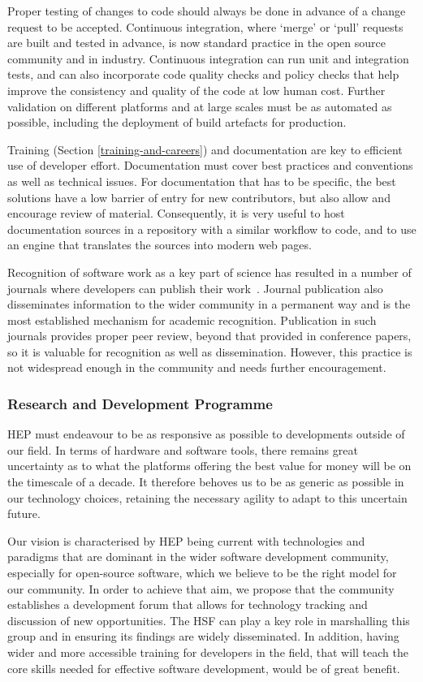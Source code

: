 Proper testing of changes to code should always be done in advance of a
change request to be accepted. Continuous integration, where `merge' or
`pull' requests are built and tested in advance, is now standard practice
in the open source community and in industry. Continuous integration can
run unit and integration tests, and can also incorporate code quality
checks and policy checks that help improve the consistency and quality
of the code at low human cost. Further validation on different platforms
and at large scales must be as automated as possible, including the
deployment of build artefacts for production.

Training (Section \ref{training-and-careers}) and documentation
are key to efficient use
of developer effort. Documentation must cover best practices and
conventions as well as technical issues. For documentation that has to
be specific, the best solutions have a low barrier of entry for new
contributors, but also allow and encourage review of material.
Consequently, it is very useful to host documentation sources in a
repository with a similar workflow to code, and to use an engine that
translates the sources into modern web pages.

Recognition of software work as a key part of science has resulted in a
number of journals where developers can publish their work~\cite{SSI2017}. Journal publication also disseminates information to the
wider community in a permanent way and is the most established mechanism
for academic recognition. Publication in such journals provides proper
peer review, beyond that provided in conference papers, so it is
valuable for recognition as well as dissemination. However, this
practice is not widespread enough in the community and needs further
encouragement.

\subsubsection*{Research and Development Programme}

HEP must endeavour to be as responsive as possible to developments
outside of our field. In terms of hardware and software tools, there
remains great uncertainty as to what the platforms offering the best
value for money will be on the timescale of a decade. It therefore
behoves us to be as generic as possible in our technology choices,
retaining the necessary agility to adapt to this uncertain future.

Our vision is characterised by HEP being current with technologies and
para\-digms that are dominant in the wider software development community,
especially for open-source software, which we believe to be the right
model for our community. In order to achieve that aim, we propose that
the community establishes a development forum that allows for technology
tracking and discussion of new opportunities. The HSF can play a key
role in marshalling this group and in ensuring its findings are widely
disseminated. In addition, having wider and more accessible training for
developers in the field, that will teach the core skills needed for
effective software development, would be of great benefit.

